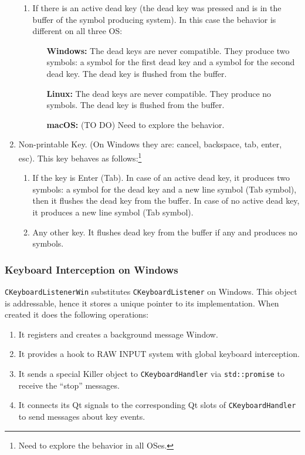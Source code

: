 \documentclass{article}
\begin{document}
\begin{enumerate}
\begin{enumerate}
\item If there is an active dead key (the dead key was pressed and is in the buffer of the symbol producing system).  In this case the behavior is different on all three OS:
\begin{itemize}
\item[\bf Windows:] The dead keys are never compatible. They produce two symbols: a symbol for the first dead key and a symbol for the second dead key. The dead key is flushed from the buffer.
\item[\bf Linux:] The dead keys are never compatible. They produce no symbols. The dead key is flushed from the buffer.
\item[\bf macOS:] (TO DO) Need to explore the behavior.
\end{itemize}

\end{enumerate}
\item Non-printable Key. (On Windows they are: cancel, backspace, tab, enter, esc). This key behaves as follows:\footnote{Need to explore the behavior in all OSes.}
\begin{enumerate}
\item If the key is Enter (Tab). In case of an active dead key, it produces two symbols: a symbol for the dead key and a new line symbol (Tab symbol), then it flushes the dead key from the buffer. In case of no active dead key, it produces a new line symbol (Tab symbol).
\item Any other key. It flushes dead key from the buffer if any and produces no symbols.
\end{enumerate}
\end{enumerate}

\subsubsection{Keyboard Interception on Windows}

\verb"CKeyboardListenerWin" substitutes \verb"CKeyboardListener" on Windows. This object is addressable, hence it stores a unique pointer to its implementation. When created it does the following operations:
\begin{enumerate}
\item It registers and creates a background message Window.

\item It provides a hook to RAW INPUT system with global keyboard interception.

\item It sends a special Killer object to \verb"CKeyboardHandler" via \verb"std::promise" to receive the ``stop'' messages.

\item It connects its Qt signals to the corresponding Qt slots of \verb"CKeyboardHandler" to send messages about key events.
\end{enumerate}
\end{document}
